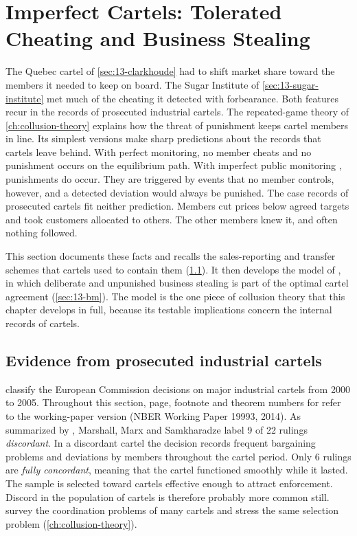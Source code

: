 \section{Imperfect Cartels: Tolerated Cheating and Business Stealing}\label{sec:13-imperfect}

The Quebec cartel of \cref{sec:13-clarkhoude} had to shift market share toward the members it needed to keep on
board. The Sugar Institute of \cref{sec:13-sugar-institute} met much of the cheating it detected with
forbearance. Both features recur in the records of prosecuted industrial cartels. The repeated-game theory of
\cref{ch:collusion-theory} explains how the threat of punishment keeps cartel members in line. Its simplest versions make sharp predictions about the records that cartels leave behind.
With perfect monitoring, no member cheats and no punishment occurs on the equilibrium path. With imperfect
public monitoring \citep{GreenPorter1984}, punishments do occur. They are triggered by events that no member
controls, however, and a detected deviation would always be punished. The case records of prosecuted cartels
fit neither prediction. Members cut prices below agreed targets and took customers allocated to others. The
other members knew it, and often nothing followed.

This section documents these facts and recalls the sales-reporting and transfer schemes that cartels used to
contain them (\cref{sec:13-imperfect-evidence}). It then develops the model of \citet{BernheimMadsen2017}, in which
deliberate and unpunished business stealing is part of the optimal cartel agreement (\cref{sec:13-bm}). The
model is the one piece of collusion theory that this chapter develops in full, because its testable
implications concern the internal records of cartels.

\subsection{Evidence from prosecuted industrial cartels}\label{sec:13-imperfect-evidence}

\citet{MarshallMarxSamkharadze2013} classify the European Commission decisions on major industrial cartels
from 2000 to 2005. Throughout this section, page, footnote and theorem numbers for \citet{BernheimMadsen2017}
refer to the working-paper version (NBER Working Paper 19993, 2014). As summarized by
\citet[footnote 2]{BernheimMadsen2017}, Marshall, Marx and Samkharadze label 9 of 22 rulings
\emph{discordant}. In a discordant cartel the decision records frequent bargaining problems and deviations by
members throughout the cartel period. Only 6 rulings are \emph{fully concordant}, meaning that the cartel
functioned smoothly while it lasted. The sample is selected toward cartels effective enough to attract
enforcement. Discord in the population of cartels is therefore probably more common still.
\citet{LevensteinSuslow2006} survey the coordination problems of many cartels and stress the same selection
problem (\cref{ch:collusion-theory}).

